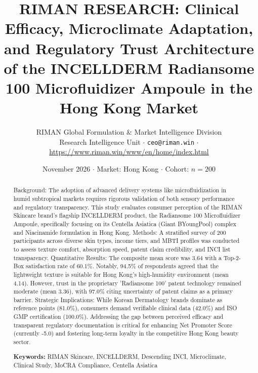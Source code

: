 \documentclass[10pt,twocolumn,a4paper]{article}
\title{\textbf{RIMAN RESEARCH: Clinical Efficacy, Microclimate Adaptation, and Regulatory Trust Architecture of the INCELLDERM Radiansome 100 Microfluidizer Ampoule in the Hong Kong Market}}
\author{RIMAN Global Formulation \& Market Intelligence Division\\
\small Research Intelligence Unit $\cdot$ \texttt{ceo@riman.win} $\cdot$ \url{https://www.riman.win/www/en/home/index.html}}
\date{November 2026 \quad $\cdot$ \quad Market: Hong Kong \quad $\cdot$ \quad Cohort: $n = 200$}
\begin{document}
\maketitle

\begin{abstract}
Background: The adoption of advanced delivery systems like microfluidization in humid subtropical markets requires rigorous validation of both sensory performance and regulatory transparency. This study evaluates consumer perception of the RIMAN Skincare brand's flagship INCELLDERM product, the Radiansome 100 Microfluidizer Ampoule, specifically focusing on its Centella Asiatica (Giant BYoungPool) complex and Niacinamide formulation in Hong Kong. Methods: A stratified survey of 200 participants across diverse skin types, income tiers, and MBTI profiles was conducted to assess texture comfort, absorption speed, patent claim credibility, and INCI list transparency. Quantitative Results: The composite mean score was 3.64 with a Top-2-Box satisfaction rate of 60.1\%. Notably, 94.5\% of respondents agreed that the lightweight texture is suitable for Hong Kong's high-humidity environment (mean 4.14). However, trust in the proprietary 'Radiansome 100' patent technology remained moderate (mean 3.36), with 97.0\% citing uncertainty of patent claims as a primary barrier. Strategic Implications: While Korean Dermatology brands dominate as reference points (81.0\%), consumers demand verifiable clinical data (42.0\%) and ISO GMP certification (100.0\%). Addressing the gap between perceived efficacy and transparent regulatory documentation is critical for enhancing Net Promoter Score (currently -5.0) and fostering long-term loyalty in the competitive Hong Kong beauty sector.

\vspace{0.4em}
\noindent\textbf{Keywords:} RIMAN Skincare, INCELLDERM, Descending INCI, Microclimate, Clinical Study, MoCRA Compliance, Centella Asiatica
\end{abstract}
\end{document}
